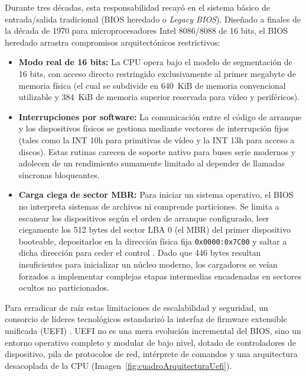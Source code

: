 \documentclass[12pt]{article}
\begin{document}
Durante tres décadas, esta responsabilidad recayó en el sistema básico de entrada/salida tradicional (BIOS heredado o \textit{Legacy BIOS}). Diseñado a finales de la década de 1970 para microprocesadores Intel 8086/8088 de 16 bits, el BIOS heredado arrastra compromisos arquitectónicos restrictivos:
\begin{itemize}[noitemsep, topsep=2pt]
    \item \textbf{Modo real de 16 bits:} La CPU opera bajo el modelo de segmentación de 16 bits, con acceso directo restringido exclusivamente al primer megabyte de memoria física (el cual se subdivide en 640~KiB de memoria convencional utilizable y 384~KiB de memoria superior reservada para vídeo y periféricos).
    \item \textbf{Interrupciones por software:} La comunicación entre el código de arranque y los dispositivos físicos se gestiona mediante vectores de interrupción fijos (tales como la INT 10h para primitivas de vídeo y la INT 13h para acceso a discos). Estas rutinas carecen de soporte nativo para buses serie modernos y adolecen de un rendimiento sumamente limitado al depender de llamadas síncronas bloqueantes.
    \item \textbf{Carga ciega de sector MBR:} Para iniciar un sistema operativo, el BIOS no interpreta sistemas de archivos ni comprende particiones. Se limita a escanear los dispositivos según el orden de arranque configurado, leer ciegamente los 512 bytes del sector LBA 0 (el MBR) del primer dispositivo booteable, depositarlos en la dirección física fija \texttt{0x0000:0x7C00} y saltar a dicha dirección para ceder el control \parencite[\S 7.4, pp.\ 377--378]{carretero2001sistemas}. Dado que 446 bytes resultan insuficientes para inicializar un núcleo moderno, los cargadores se veían forzados a implementar complejas etapas intermedias encadenadas en sectores ocultos no particionados.
\end{itemize}

Para erradicar de raíz estas limitaciones de escalabilidad y seguridad, un consorcio de líderes tecnológicos estandarizó la interfaz de firmware extensible unificada (UEFI) \parencite{uefi2024specification}. UEFI no es una mera evolución incremental del BIOS, sino un entorno operativo completo y modular de bajo nivel, dotado de controladores de dispositivo, pila de protocolos de red, intérprete de comandos y una arquitectura desacoplada de la CPU (Imagen~\ref{fig:cuadroArquitecturaUefi}).
\end{document}

